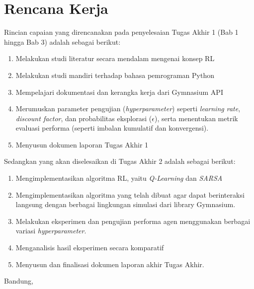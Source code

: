 \documentclass[a4paper,twoside]{article}
\begin{document}
\section{Rencana Kerja}
Rincian capaian yang direncanakan pada penyelesaian Tugas Akhir 1 (Bab 1 hingga Bab 3) adalah sebagai berikut:
\begin{enumerate}
	\item Melakukan studi literatur secara mendalam mengenai konsep RL
	\item Melakukan studi mandiri terhadap bahasa pemrograman Python
	\item Mempelajari dokumentasi dan kerangka kerja dari Gymnasium API
	\item Merumuskan parameter pengujian (\textit{hyperparameter}) seperti \textit{learning rate}, \textit{discount factor}, dan probabilitas eksplorasi ($\epsilon$), serta menentukan metrik evaluasi performa (seperti imbalan kumulatif dan konvergensi).
	\item Menyusun dokumen laporan Tugas Akhir 1
\end{enumerate}
	
	Sedangkan yang akan diselesaikan di Tugas Akhir 2 adalah sebagai berikut:
	\begin{enumerate}
		\item Mengimplementasikan algoritma RL, yaitu \textit{Q-Learning} dan \textit{SARSA}
		\item Mengimplementasikan algoritma yang telah dibuat agar dapat berinteraksi langsung dengan berbagai lingkungan simulasi dari library Gymnasium.
		\item Melakukan eksperimen dan pengujian performa agen menggunakan berbagai variasi \textit{hyperparameter}.
		\item Menganalisis hasil eksperimen secara komparatif 
		\item Menyusun dan finalisasi dokumen laporan akhir Tugas Akhir.
	\end{enumerate}
	
	\vspace{1cm}
	\centering Bandung, \tanggal\\
	\vspace{2cm} \nama \\ 
	\vspace{1cm}
	
\end{document}
